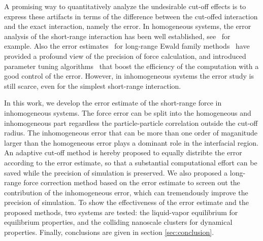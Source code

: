 \documentclass[aps,pre,preprint]{revtex4}
\begin{document}


A promising way to quantitatively analyze the undesirable cut-off
effects is to express these artifacts in terms of the difference
between the cut-offed interaction and the exact interaction, namely
the error. In homogeneous systems, the error analysis of the
short-range interaction has been well established,
see~\cite{kolafa1992cutoff} for example. Also the error
estimates~\cite{hummer1995numerical, kolafa1992cutoff,
  petersen1995accuracy, deserno1998mue2, wang2010optimizing} for
long-range Ewald family methods~\cite{ewald1921die,
  hockney1988computer, deserno1998mue1, darden1993pme, essmann1995spm}
have provided a profound view of the precision of force calculation,
and introduced parameter tuning algorithms~\cite{limbach06a,
  wang2010optimizing} that boost the efficiency of the computation
with a good control of the error. However, in inhomogeneous systems
the error study is still scarce, even for the simplest short-range
interaction.

In this work, we develop the error estimate of the short-range force
in inhomogeneous systems. The force error can be split into the
homogeneous and inhomogeneous part regardless the particle-particle
correlation outside the cut-off radius. The inhomogeneous error that
can be more than one order of maganitude larger than the homogeneous
error plays a dominant role in the interfacial region. An adaptive
cut-off method is hereby proposed to equally distribte the error
according to the error estimate, so that a substantial computational
effort can be saved while the precision of simulation is preserved. We
also proposed a long-range force correction method based on the error
estimate to screen out the contribution of the inhomogeneous error,
which can tremendously improve the precision of simulation. To show
the effectiveness of the error estimate and the proposed methods, two
systems are tested: the liquid-vapor equilibrium for equilibrium
properties, and the colliding nanoscale clusters for dynamical
properties. Finally, conclusions are given in section
\ref{sec:conclusion}.
\end{document}
